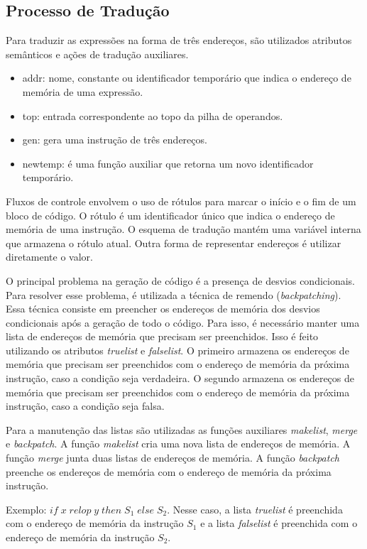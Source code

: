 \documentclass[12pt,a4paper]{article}
\begin{document}
\subsection{Processo de Tradução}

Para traduzir as expressões na forma de três endereços, são utilizados atributos semânticos e ações de tradução auxiliares.
\begin{itemize}
    \item addr: nome, constante ou identificador temporário que indica o endereço de memória de uma expressão.
    \item top: entrada correspondente ao topo da pilha de operandos.
    \item gen: gera uma instrução de três endereços.
    \item newtemp: é uma função auxiliar que retorna um novo identificador temporário.
\end{itemize}

Fluxos de controle envolvem o uso de rótulos para marcar o início e o fim de um bloco de código. O rótulo é um identificador único que indica o endereço de memória de uma instrução. O esquema de tradução mantém uma variável interna que armazena o rótulo atual. Outra forma de representar endereços é utilizar diretamente o valor.

O principal problema na geração de código é a presença de desvios condicionais. Para resolver esse problema, é utilizada a técnica de remendo (\textit{backpatching}). Essa técnica consiste em preencher os endereços de memória dos desvios condicionais após a geração de todo o código. Para isso, é necessário manter uma lista de endereços de memória que precisam ser preenchidos. Isso é feito utilizando os atributos \textit{truelist} e \textit{falselist}. O primeiro armazena os endereços de memória que precisam ser preenchidos com o endereço de memória da próxima instrução, caso a condição seja verdadeira. O segundo armazena os endereços de memória que precisam ser preenchidos com o endereço de memória da próxima instrução, caso a condição seja falsa.

Para a manutenção das listas são utilizadas as funções auxiliares \textit{makelist}, \textit{merge} e \textit{backpatch}. A função \textit{makelist} cria uma nova lista de endereços de memória. A função \textit{merge} junta duas listas de endereços de memória. A função \textit{backpatch} preenche os endereços de memória com o endereço de memória da próxima instrução.

Exemplo: $ if \; x \; relop \; y \; then \; S_1 \; else \; S_2 $. Nesse caso, a lista \textit{truelist} é
preenchida com o endereço de memória da instrução $ S_1 $ e a lista \textit{falselist} é preenchida com o endereço de memória da instrução $ S_2 $.
\end{document}
